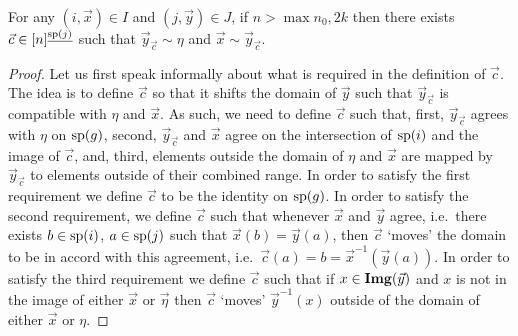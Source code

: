 \documentclass[../main/thesis.tex]{subfiles}
\begin{document}
\begin{lem}
	\label{lem:permutation-row-column}
	For any $(i, \vec{x}) \in I$ and $(j, \vec{y}) \in J$, if $n > \max{n_0, 2k}$
  then there exists $\vec{c} \in [n]^{\underline{\text{sp}(j)}}$ such that
  $\vec{y}_{\vec{c}} \sim \eta$ and $\vec{x} \sim \vec{y}_{\vec{c}}$.
\end{lem}

\begin{proof}
  Let us first speak informally about what is required in the definition of
  $\vec{c}$. The idea is to define $\vec{c}$ so that it shifts the domain of
  $\vec{y}$ such that $\vec{y}_{\vec{c}}$ is compatible with $\eta$ and
  $\vec{x}$. As such, we need to define $\vec{c}$ such that, first,
  $\vec{y}_{\vec{c}}$ agrees with $\eta$ on $\text{sp}(g)$, second,
  $\vec{y}_{\vec{c}}$ and $\vec{x}$ agree on the intersection of $\text{sp}(i)$ and
  the image of $\vec{c}$, and, third, elements outside the domain of $\eta$ and
  $\vec{x}$ are mapped by $\vec{y}_{\vec{c}}$ to elements outside of their
  combined range. In order to satisfy the first requirement we define $\vec{c}$
  to be the identity on $\text{sp}(g)$. In order to satisfy the second requirement,
  we define $\vec{c}$ such that whenever $\vec{x}$ and $\vec{y}$ agree, i.e.\
  there exists $b \in \text{sp}(i)$, $a \in \text{sp}(j)$ such that $\vec{x}(b) =
  \vec{y}(a)$, then $\vec{c}$ `moves' the domain to be in accord with this
  agreement, i.e.\ $\vec{c}(a) = b = \vec{x}^{-1}(\vec{y}(a))$. In order to
  satisfy the third requirement we define $\vec{c}$ such that if $x \in
  \text{\textbf{Img}}(\vec{y})$ and $x$ is not in the image of either $\vec{x}$ or $\vec{\eta}$
  then $\vec{c}$ `moves' $\vec{y}^{-1}(x)$ outside of the domain of either
  $\vec{x}$ or $\eta$.


\end{proof}
\end{document}
